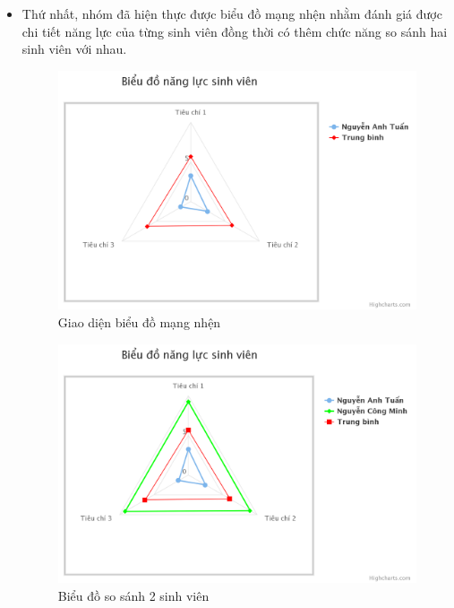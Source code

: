 \begin{itemize}
	\item Thứ nhất, nhóm đã hiện thực được biểu đồ mạng nhện nhằm đánh giá được chi tiết năng lực của từng sinh viên đồng thời có thêm chức năng so sánh hai sinh viên với nhau.
	
	\begin{center}
		\begin{figure}[htp]
			\begin{center}
				\includegraphics[width=0.8\linewidth]{img/22}
			\end{center}
			\caption{Giao diện biểu đồ mạng nhện}
			\label{refhinh70}
		\end{figure}
	\end{center}

	\begin{center}
		\begin{figure}[htp]
			\begin{center}
				\includegraphics[width=0.8\linewidth]{img/25}
			\end{center}
			\caption{Biểu đồ so sánh 2 sinh viên}
			\label{refhinh71}
		\end{figure}
	\end{center}


\end{itemize}
